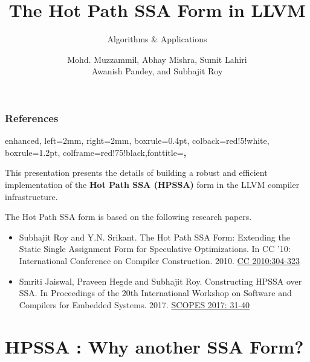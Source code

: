 \documentclass[aspectratio=169, compress]{beamer}
\title[Hot Path SSA in LLVM] %
{The Hot Path SSA Form in LLVM}
\subtitle{Algorithms \& Applications}
\author[Muzzammil, Mishra, Lahiri, Pandey, and Roy] %
{Mohd. Muzzammil\inst{1}, Abhay Mishra\inst{1}, Sumit Lahiri\inst{1} \\ Awanish Pandey\inst{2}, and Subhajit Roy\inst{1}}
\institute[IDK] %
{
	\inst{1}%
	Dept. of Computer Science \& Engineering,
	IIT Kanpur \\
	\inst{2}%
	Qualcomm India Pvt. Ltd.
}
\date[01/03/2022] %
\begin{document}
\frame{\titlepage}
\begin{frame}
	\frametitle{References}
	\tcbset
	{
		enhanced,
		left=2mm,
		right=2mm,
		boxrule=0.4pt,
		colback=red!5!white,
		boxrule=1.2pt,
		colframe=red!75!black,fonttitle=\bfseries,
	}
	\begin{tcolorbox}[colback=red!3!white,colframe=red!50!black,lifted shadow={1mm}{-2mm}{3mm}{0.1mm}{black!50!white}]
		This presentation presents the details of building a robust and efficient implementation of the \textbf{Hot Path SSA (HPSSA)} form in the LLVM compiler infrastructure. 
	\end{tcolorbox}
	\pause \vspace{10pt}
	The Hot Path SSA form is based on the following research papers.
	\vspace{15pt}
	\begin{itemize}
		\setlength\itemsep{1em} 
		\item Subhajit Roy and Y.N. Srikant. The Hot Path SSA Form: Extending the Static Single Assignment Form for Speculative Optimizations. In CC '10: International Conference on Compiler Construction. 2010. \href{https://link.springer.com/chapter/10.1007/978-3-642-11970-5_17}{CC 2010:304-323} 
		\item Smriti Jaiswal, Praveen Hegde and Subhajit Roy. Constructing HPSSA over SSA. In Proceedings of the 20th International Workshop on Software and Compilers for Embedded Systems. 2017.
		\href{https://dl.acm.org/doi/10.1145/3078659.3078660}{SCOPES 2017: 31-40}
	\end{itemize}
\end{frame}
\footnotesize
\section{HPSSA : Why another SSA Form?}
\end{document}
